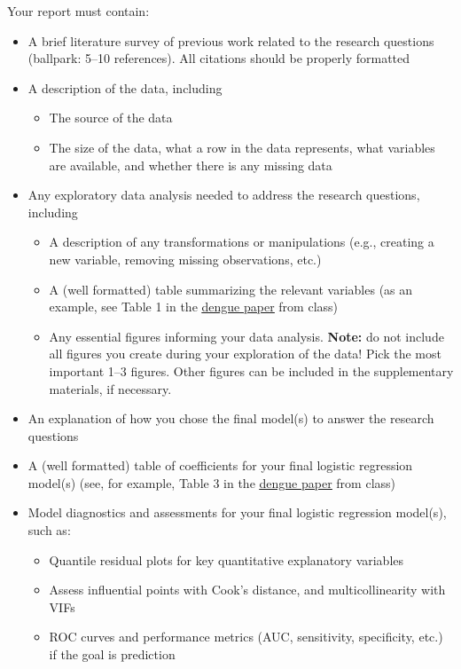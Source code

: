 \documentclass[11pt]{article}
\begin{document}
Your report must contain:
\begin{itemize}
\item A brief literature survey of previous work related to the research questions (ballpark: 5--10 references). All citations should be properly formatted 

\item A description of the data, including
\begin{itemize}
\item The source of the data
\item The size of the data, what a row in the data represents, what variables are available, and whether there is any missing data
\end{itemize}

\item Any exploratory data analysis needed to address the research questions, including
\begin{itemize}
\item A description of any transformations or manipulations (e.g., creating a new variable, removing missing observations, etc.)
\item A (well formatted) table summarizing the relevant variables (as an example, see Table 1 in the \href{https://journals.plos.org/plosntds/article?id=10.1371/journal.pntd.0003638}{\underline{dengue paper}} from class)
\item Any essential figures informing your data analysis. \textbf{Note:} do not include all figures you create during your exploration of the data! Pick the most important 1--3 figures. Other figures can be included in the supplementary materials, if necessary.
\end{itemize}

\item An explanation of how you chose the final model(s) to answer the research questions

\item A (well formatted) table of coefficients for your final logistic regression model(s) (see, for example, Table 3 in the \href{https://journals.plos.org/plosntds/article?id=10.1371/journal.pntd.0003638}{\underline{dengue paper}} from class)

\item Model diagnostics and assessments for your final logistic regression model(s), such as:
\begin{itemize}
\item Quantile residual plots for key quantitative explanatory variables
\item Assess influential points with Cook's distance, and multicollinearity with VIFs
\item ROC curves and performance metrics (AUC, sensitivity, specificity, etc.) if the goal is prediction
\end{itemize}


\end{itemize}
\end{document}
